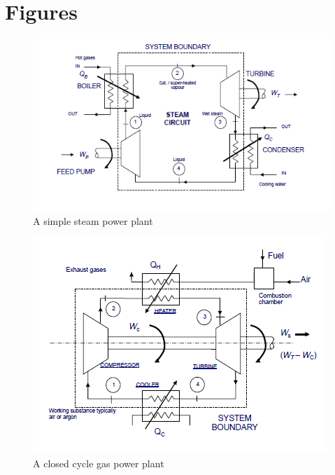 \documentclass[class=report, crop=false, 12pt,a4paper]{standalone}
\begin{document}
\section{Figures}
\begin{figure}[H]
  \begin{center}
    \includegraphics[width = \textwidth]{../img/SimpleSteamPP}
    \caption{A simple steam power plant}
  \end{center}
\end{figure}
\begin{figure}[H]
  \begin{center}
    \includegraphics[width = \textwidth]{../img/ClosedCycleGasPP}
    \caption{A closed cycle gas power plant}
  \end{center}
\end{figure}
\end{document}
